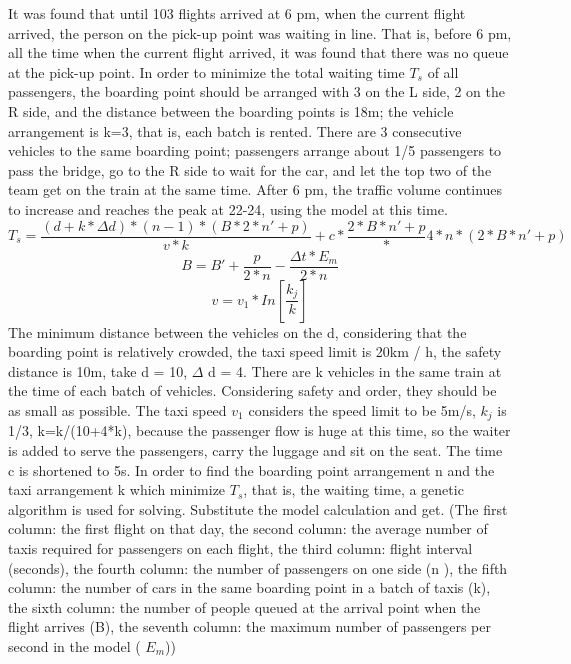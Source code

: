 \begin{enumerate}
It was found that until 103 flights arrived at 6 pm, when the current flight arrived, the person on the pick-up point was waiting in line. That is, before 6 pm, all the time when the current flight arrived, it was found that there was no queue at the pick-up point. In order to minimize the total waiting time $T_s$ of all passengers, the boarding point should be arranged with 3 on the L side, 2 on the R side, and the distance between the boarding points is 18m; the vehicle arrangement is k=3, that is, each batch is rented. There are 3 consecutive vehicles to the same boarding point; passengers arrange about 1/5 passengers to pass the bridge, go to the R side to wait for the car, and let the top two of the team get on the train at the same time.
After 6 pm, the traffic volume continues to increase and reaches the peak at 22-24, using the model at this time.
\begin{equation} T_{s} = \frac{{(d+k*\Delta d)}*{(n-1)}*{(B*2*n'+p)}}{v*k}+c*\frac{2*B*n'+p}*{4*n}*{(2*B*n'+p)}\end{equation}
\begin{equation} B =B'+\frac{p}{2*n}-\frac{\Delta t*E_m}{2*n} \end{equation}
\begin{equation} v =v_1 * In[\frac{k_j}{k}]\end{equation}
The minimum distance between the vehicles on the d, considering that the boarding point is relatively crowded, the taxi speed limit is 20km / h, the safety distance is 10m, take d = 10, $\Delta$ d = 4. There are k vehicles in the same train at the time of each batch of vehicles. Considering safety and order, they should be as small as possible. The taxi speed $v_1$ considers the speed limit to be 5m/s, $k_j$ is 1/3, k=k/(10+4*k), because the passenger flow is huge at this time, so the waiter is added to serve the passengers, carry the luggage and sit on the seat. The time c is shortened to 5s.
In order to find the boarding point arrangement n and the taxi arrangement k which minimize $T_s$, that is, the waiting time, a genetic algorithm is used for solving.
Substitute the model calculation and get. (The first column: the first flight on that day, the second column: the average number of taxis required for passengers on each flight, the third column: flight interval (seconds), the fourth column: the number of passengers on one side (n ), the fifth column: the number of cars in the same boarding point in a batch of taxis (k), the sixth column: the number of people queued at the arrival point when the flight arrives (B), the seventh column: the maximum number of passengers per second in the model ( $E_m$))

\end{enumerate}
